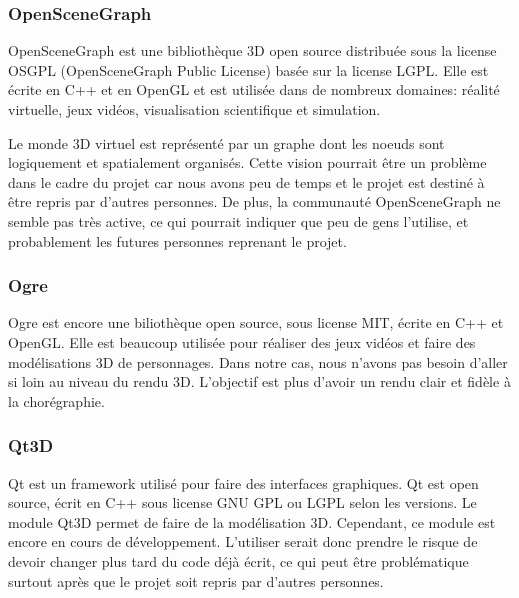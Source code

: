 \subsubsection{OpenSceneGraph}

OpenSceneGraph est une bibliothèque 3D open source distribuée sous la license OSGPL (OpenSceneGraph Public License) basée sur la license LGPL. Elle est écrite en C++ et en OpenGL et est utilisée dans de nombreux domaines: réalité virtuelle, jeux vidéos, visualisation scientifique et simulation. 

Le monde 3D virtuel est représenté par un graphe dont les noeuds sont logiquement et spatialement organisés. Cette vision pourrait être un problème dans le cadre du projet car nous avons peu de temps et le projet est destiné à être repris par d'autres personnes. De plus, la communauté OpenSceneGraph ne semble pas très active, ce qui pourrait indiquer que peu de gens l'utilise, et probablement les futures personnes reprenant le projet. 

\subsubsection{Ogre}

Ogre est encore une biliothèque open source, sous license MIT, écrite en C++ et OpenGL. Elle est beaucoup utilisée pour réaliser des jeux vidéos et faire des modélisations 3D de personnages. Dans notre cas, nous n'avons pas besoin d'aller si loin au niveau du rendu 3D. L'objectif est plus d'avoir un rendu clair et fidèle à la chorégraphie.  




\subsubsection{Qt3D}

Qt est un framework utilisé pour faire des interfaces graphiques. Qt est open source, écrit en C++ sous license GNU GPL ou LGPL selon les versions. Le module Qt3D permet de faire de la modélisation 3D. Cependant, ce module est encore en cours de développement. L'utiliser serait donc prendre le risque de devoir changer plus tard du code déjà écrit, ce qui peut être problématique surtout après que le projet soit repris par d'autres personnes. 

